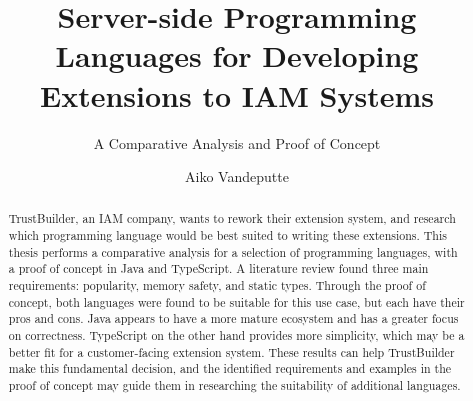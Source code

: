 \documentclass[a0,portrait,english]{hogent-poster}
\title{Server-side Programming Languages for Developing Extensions to IAM Systems}
\subtitle{A Comparative Analysis and Proof of Concept}
\author{Aiko Vandeputte}
\begin{document}
\maketitle

\begin{abstract}
TrustBuilder, an IAM company, wants to rework their extension system, and research which programming language would be best suited to writing these extensions. This thesis performs a comparative analysis for a selection of programming languages, with a proof of concept in Java and TypeScript. A literature review found three main requirements: popularity, memory safety, and static types. Through the proof of concept, both languages were found to be suitable for this use case, but each have their pros and cons. Java appears to have a more mature ecosystem and has a greater focus on correctness. TypeScript on the other hand provides more simplicity, which may be a better fit for a customer-facing extension system. These results can help TrustBuilder make this fundamental decision, and the identified requirements and examples in the proof of concept may guide them in researching the suitability of additional languages.
\end{abstract}
\end{document}
